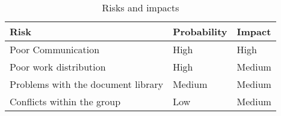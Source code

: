 \documentclass{article}
\begin{document}
    \begin{table}[h]
        \centering
        \begin{tabular}{|l|l|l|}
             \hline
             \textbf{Risk} 
             & \textbf{Probability}
             & \textbf{Impact} \\
             \hline
             Poor Communication 
             & High
             & High \\
             \hline
             Poor work distribution
             & High
             & Medium \\
             \hline
             Problems with the document library
             & Medium
             & Medium \\
             \hline
             Conflicts within the group
             & Low
             & Medium \\
             \hline
        \end{tabular}
        \caption{Risks and impacts}
        \label{tab:my_label}
    \end{table}
\end{document}
